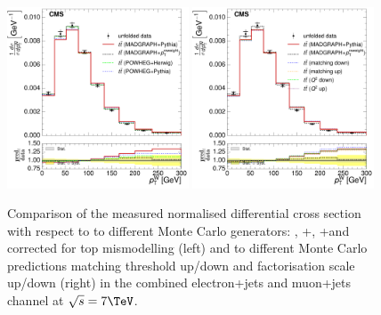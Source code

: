 \begin{figure}[hbtp]
    \centering
     \includegraphics[width=0.48\textwidth]{Chapters/04_Analysis/04b_XSections/images/results/7TeV/WPT/central/normalised_xsection_combined_different_generators.pdf}\hfill
     \includegraphics[width=0.48\textwidth]{Chapters/04_Analysis/04b_XSections/images/results/7TeV/WPT/central/normalised_xsection_combined_systematics_shifts.pdf}\hfill
     \caption{Comparison of the measured normalised differential cross section with respect to \wpt to
     different Monte Carlo generators: \MADGRAPH, \POWHEG+\HERWIG, \POWHEG+\PYTHIA and \MADGRAPH corrected for
     top \pt mismodelling (left) and to different Monte Carlo predictions matching threshold up/down and
     factorisation scale up/down (right) in the combined electron+jets and muon+jets channel at
     $\sqrt{s}=7\TeV$.}
     \label{fig:result_MT_7TeV_combined}
\end{figure}

